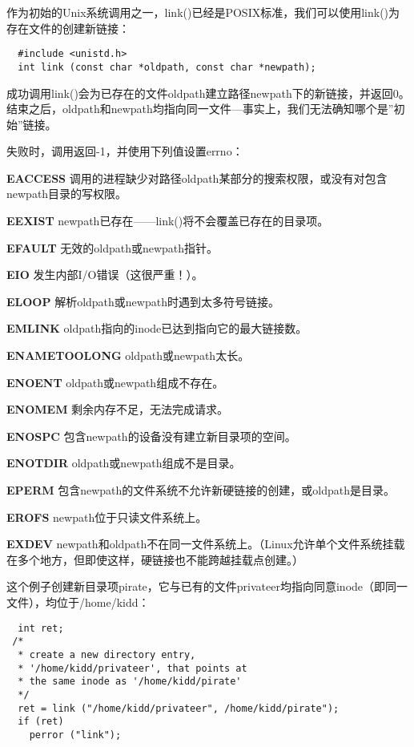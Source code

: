 作为初始的Unix系统调用之一，link()已经是POSIX标准，我们可以使用link()为存在文件的创建新链接：

\begin{lstlisting}
  #include <unistd.h>
  int link (const char *oldpath, const char *newpath);
\end{lstlisting}

成功调用link()会为已存在的文件oldpath建立路径newpath下的新链接，并返回0。结束之后，oldpath和newpath均指向同一文件—事实上，我们无法确知哪个是''初始''链接。

失败时，调用返回-1，并使用下列值设置errno：

\begin{eqlist*}
\item[\textbf{EACCESS}] 调用的进程缺少对路径oldpath某部分的搜索权限，或没有对包含newpath目录的写权限。
\item[\textbf{EEXIST}] newpath已存在——link()将不会覆盖已存在的目录项。
\item[\textbf{EFAULT}] 无效的oldpath或newpath指针。
\item[\textbf{EIO}] 发生内部I/O错误（这很严重！）。
\item[\textbf{ELOOP}] 解析oldpath或newpath时遇到太多符号链接。
\item[\textbf{EMLINK}] oldpath指向的inode已达到指向它的最大链接数。
\item[\textbf{ENAMETOOLONG}] oldpath或newpath太长。
\item[\textbf{ENOENT}] oldpath或newpath组成不存在。
\item[\textbf{ENOMEM}] 剩余内存不足，无法完成请求。
\item[\textbf{ENOSPC}] 包含newpath的设备没有建立新目录项的空间。
\item[\textbf{ENOTDIR}] oldpath或newpath组成不是目录。
\item[\textbf{EPERM}] 包含newpath的文件系统不允许新硬链接的创建，或oldpath是目录。
\item[\textbf{EROFS}] newpath位于只读文件系统上。
\item[\textbf{EXDEV}] newpath和oldpath不在同一文件系统上。（Linux允许单个文件系统挂载在多个地方，但即使这样，硬链接也不能跨越挂载点创建。）
\end{eqlist*}

这个例子创建新目录项pirate，它与已有的文件privateer均指向同意inode（即同一文件），均位于/home/kidd：

\begin{lstlisting}
  int ret;
 /*
  * create a new directory entry,
  * '/home/kidd/privateer', that points at
  * the same inode as '/home/kidd/pirate'
  */
  ret = link ("/home/kidd/privateer", /home/kidd/pirate");
  if (ret)
    perror ("link");
\end{lstlisting}

